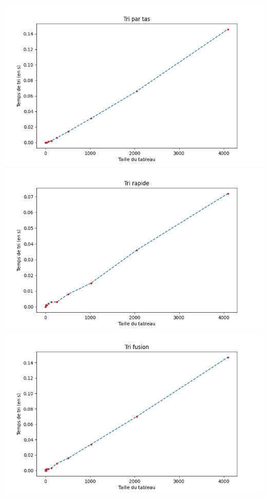 \documentclass[11pt,a4paper]{article}
\begin{document}
    \includegraphics[scale = 0.7]{../Courbes/Valeurs_random_avec_répétiton/Tri par tas.png}
    \includegraphics[scale = 0.7]{../Courbes/Valeurs_random_avec_répétiton/Tri rapide.png}
    \includegraphics[scale = 0.7]{../Courbes/Valeurs_random_avec_répétiton/Tri fusion.png}
\end{document}
